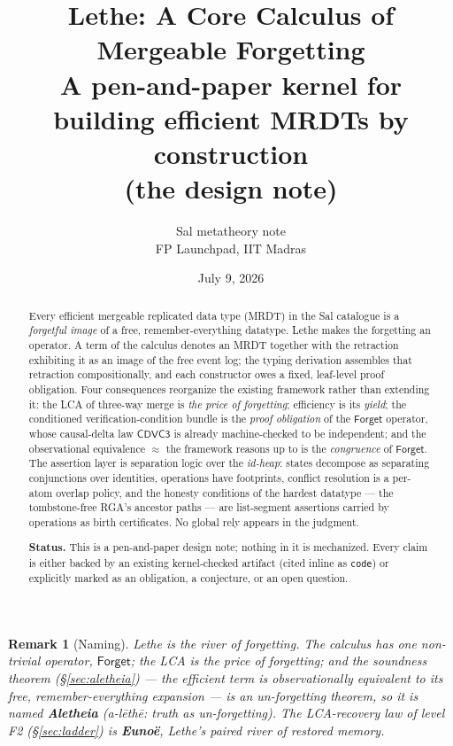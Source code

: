 \documentclass[11pt]{article}
\title{\bfseries Lethe: A Core Calculus of Mergeable Forgetting\\
\large A pen-and-paper kernel for building efficient MRDTs by construction\\
(the \lean{oq:proglogic} design note)}
\author{Sal metatheory note\\ \small FP Launchpad, IIT Madras}
\date{July 9, 2026}
\newtheorem{remark}[theorem]{Remark}
\newcommand{\cd}{\mathsf{CDVC3}}
\newcommand{\lean}[1]{\texttt{#1}}
\newcommand{\eqobs}{\approx}
\newcommand{\Forget}{\mathsf{Forget}}
\begin{document}
\maketitle

\begin{abstract}
\noindent
Every efficient mergeable replicated data type (MRDT) in the Sal catalogue
is a \emph{forgetful image} of a free, remember-everything datatype. Lethe
makes the forgetting an operator. A term of the calculus denotes an MRDT
together with the retraction exhibiting it as an image of the free
event log; the typing derivation assembles that retraction compositionally,
and each constructor owes a fixed, leaf-level proof obligation. Four
consequences reorganize the existing framework rather than extending it:
the LCA of three-way merge is \emph{the price of forgetting}; efficiency is
its \emph{yield}; the conditioned verification-condition bundle is the
\emph{proof obligation} of the $\Forget$ operator, whose causal-delta law
$\cd$ is already machine-checked to be independent; and the observational
equivalence $\eqobs$ the framework reasons up to is the \emph{congruence}
of $\Forget$. The assertion layer is separation logic over the
\emph{id-heap}: states decompose as separating conjunctions over
identities, operations have footprints, conflict resolution is a per-atom
overlap policy, and the honesty conditions of the hardest datatype --- the
tombstone-free RGA's ancestor paths --- are list-segment assertions carried
by operations as birth certificates. No global rely appears in the
judgment.

\medskip
\noindent\textbf{Status.} This is a pen-and-paper design note; nothing in
it is mechanized. Every claim is either backed by an existing
kernel-checked artifact (cited inline as \lean{code}) or explicitly marked
as an obligation, a conjecture, or an open question.
\end{abstract}

\begin{remark}[Naming]
Lethe is the river of forgetting. The calculus has one non-trivial
operator, $\Forget$; the LCA is the price of forgetting; and the soundness
theorem (\S\ref{sec:aletheia}) --- the efficient term is observationally
equivalent to its free, remember-everything expansion --- is an
\emph{un-forgetting} theorem, so it is named \textbf{Aletheia}
(\emph{a-l\={e}th\={e}}: truth as un-forgetting). The LCA-recovery law of level F2
(\S\ref{sec:ladder}) is \textbf{Euno\"e}, Lethe's paired river of restored
memory.
\end{remark}
\end{document}
